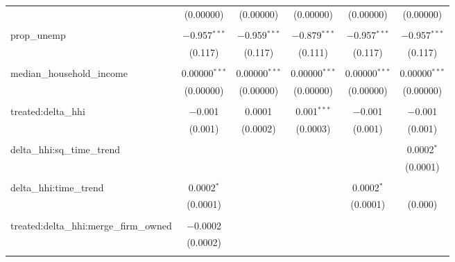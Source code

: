 \begin{table}[H]
{\begin{tabular}{@{\extracolsep{5pt}}lccccc}
   & (0.00000) & (0.00000) & (0.00000) & (0.00000) & (0.00000) \\  

   & & & & & \\  

  prop\_unemp & $-$0.957$^{***}$ & $-$0.959$^{***}$ & $-$0.879$^{***}$ & $-$0.957$^{***}$ & $-$0.957$^{***}$ \\  

   & (0.117) & (0.117) & (0.111) & (0.117) & (0.117) \\  

   & & & & & \\  

  median\_household\_income & 0.00000$^{***}$ & 0.00000$^{***}$ & 0.00000$^{***}$ & 0.00000$^{***}$ & 0.00000$^{***}$ \\  

   & (0.00000) & (0.00000) & (0.00000) & (0.00000) & (0.00000) \\  

   & & & & & \\  

  treated:delta\_hhi & $-$0.001 & 0.0001 & 0.001$^{***}$ & $-$0.001 & $-$0.001 \\  

   & (0.001) & (0.0002) & (0.0003) & (0.001) & (0.001) \\  

   & & & & & \\  

  delta\_hhi:sq\_time\_trend &  &  &  &  & 0.0002$^{*}$ \\  

   &  &  &  &  & (0.0001) \\  

   & & & & & \\  

  delta\_hhi:time\_trend & 0.0002$^{*}$ &  &  & 0.0002$^{*}$ &  \\  

   & (0.0001) &  &  & (0.0001) & (0.000) \\  

   & & & & & \\  

  treated:delta\_hhi:merge\_firm\_owned & $-$0.0002 &  &  &  &  \\  

   & (0.0002) &  &  &  &  \\  

   & & & & & \\  


\end{tabular}}
\end{table}
